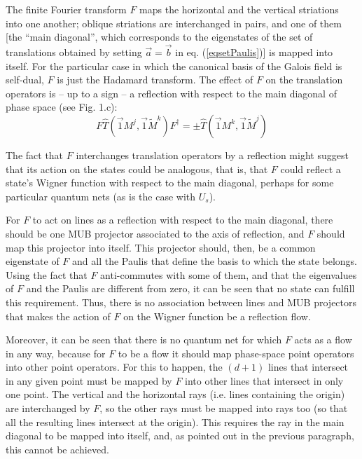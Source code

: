 \documentclass[aps,twocolumn,showpacs,nofootinbib,superscriptaddress]{revtex4}
\begin{document}
The finite Fourier transform $F$ \cite{KlimovS-SdG05} maps the
horizontal and the vertical striations into one another; oblique
striations are interchanged in pairs, and one of them [the ``main
diagonal'', which corresponds to the eigenstates of the set of
translations obtained by setting $\vec{a} = \vec {b}$ in eq.
(\ref{eqsetPaulis})] is mapped into itself. For the particular
case in which the canonical basis of the Galois field is
self-dual, $F$ is just the Hadamard transform. The effect of $F$
on the translation operators is -- up to a sign -- a reflection
with respect to the main diagonal of phase space (see Fig. 1.c):
\begin{equation}
F \hat{T}(\vec {1} M^j, \vec {1} \widetilde {M}^k) F^\dagger = \pm \hat{T}(\vec {1} M^k, \vec {1} \widetilde {M}^j)
\end{equation}

The fact that $F$ interchanges translation operators by a reflection might
suggest that its action on the states could be analogous, that is, that $F$
could reflect a state's Wigner function with respect to the main diagonal,
perhaps for some particular quantum nets (as is the case with $U_s$).

For $F$ to act on lines as a reflection with respect to the main
diagonal, there should be one MUB projector associated to the axis
of reflection, and $F$ should map this projector into itself. This
projector should, then, be a common eigenstate of $F$ and all the
Paulis that define the basis to which the state belongs. Using the
fact that $F$ anti-commutes with some of them, and that the
eigenvalues of $F$ and the Paulis are different from zero, it can
be seen that no state can fulfill this requirement. Thus, there is
no association between lines and MUB projectors that makes the
action of $F$ on the Wigner function be a reflection flow.

Moreover, it can be seen that there is no quantum net for which $F$ acts as a
flow in any way, because for $F$ to be a flow it should map phase-space point operators
into other point operators. For this to happen, the $(d+1)$ lines that
intersect in any given point must be mapped by $F$ into other lines that
intersect in only one point. The vertical and the horizontal rays (i.e. lines containing the origin) are
interchanged by $F$, so the other rays must be mapped into rays too (so
that all the resulting lines intersect at the origin). This requires the
ray in the main diagonal to be  mapped into itself, and, as pointed out in
the previous paragraph, this cannot be achieved.
\end{document}
